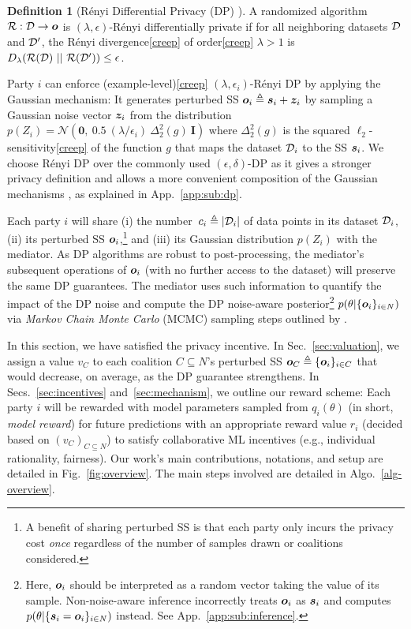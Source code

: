 \documentclass{article}
\DeclareRobustCommand{\hlp}[1]
{{#1}}
\theoremstyle{plain}
\theoremstyle{definition}
\newtheorem{definition}[theorem]{Definition}
\theoremstyle{remark}
\renewcommand{\citet}[1]{\cite{#1}}
\begin{document}
\begin{definition}[R{\'e}nyi Differential Privacy (DP) \cite{mironov2017renyi}]\label{def:renyi}
A randomized algorithm $\mathcal{R}: {\mathcal{D}} \rightarrow {\bm{o}}$ is $(\lambda, \epsilon)$-R{\'e}nyi differentially private if for all neighboring datasets ${\mathcal{D}}$ and ${\mathcal{D}}'$, the R{\'e}nyi divergence\cref{creep}
of order\cref{creep}
$\lambda>1$ is $D_\lambda(\mathcal{R}(\gD)\ ||\ \mathcal{R}(\gD'))  
\leq \epsilon$. 
\end{definition}

Party $i$ can enforce \hlp{(example-level)}\cref{creep}
$(\lambda, \epsilon_i)$-R{\'e}nyi DP by applying the Gaussian mechanism: It generates perturbed SS ${\bm{o}}_i \triangleq {\bm{s}}_i +  {\bm{z}}_i$ by sampling a Gaussian noise vector ${\bm{z}}_i$ from the distribution $p(Z_i)=\mathcal{N}(\boldsymbol{0},\ 0.5\ ({\lambda}/\epsilon_i)\  \Delta_2^2(g)\ \boldsymbol{I})$ 
where $ \Delta_2^2(g)$ is the squared $\ell_2$-sensitivity\cref{creep}
of the function $g$ that maps the dataset ${\mathcal{D}}_i$ to the SS ${\bm{s}}_i$. We choose R{\'e}nyi DP over the commonly used $(\epsilon, \delta)$-DP as it gives a stronger privacy definition and allows a more convenient composition of the Gaussian mechanisms \cite{mironov2017renyi}, as explained in App.~\ref{app:sub:dp}.

Each party $i$ will share (i) the number~$c_i \triangleq |{\mathcal{D}}_i|$ of data points in its dataset ${\mathcal{D}}_i$, (ii) its perturbed SS ${\bm{o}}_i$,\footnote{A benefit of sharing perturbed SS is that each party only incurs the privacy cost \emph{once} regardless of the number of samples drawn or coalitions considered.} and (iii) its Gaussian distribution $p(Z_i)$ with the mediator. As DP algorithms are robust to post-processing, the mediator's subsequent operations of ${\bm{o}}_i$ (with no further access to the dataset) will preserve the same DP guarantees.
The mediator uses such information to quantify the impact of the DP noise and compute the DP noise-aware posterior\footnote{Here, ${\bm{o}}_i$ should be interpreted as a random vector taking the value of its sample. Non-noise-aware inference incorrectly treats ${\bm{o}}_i$ as ${\bm{s}}_i$ and computes $p(\theta|\{ {\bm{s}}_i = {\bm{o}}_i\}_{i \in N})$ instead. See App.~\ref{app:sub:inference}.\label{footnote-vo}}
 $p(\theta | \{{\bm{o}}_i\}_{i \in N})$ via \emph{Markov Chain Monte Carlo} (MCMC) sampling steps outlined by \citet{bernstein2018expfam,bernstein2019blr,kulkarni2021glm}.




In this section, we have satisfied the privacy incentive. In Sec.~\ref{sec:valuation}, we assign a value $v_C$ to each coalition $C \subseteq N$'s perturbed SS ${\bm{o}}_C \triangleq \{{\bm{o}}_i\}_{i \in C}$ that would decrease, on average, as the DP guarantee strengthens.
In Secs.~\ref{sec:incentives} and~\ref{sec:mechanism}, we outline our reward scheme: Each party $i$ will be rewarded with model parameters sampled from $q_i(\theta)$ (in short, \emph{model reward}) for future predictions with an appropriate reward value $r_i$ (decided based on $(v_C)_{C \subseteq N}$) to satisfy collaborative ML incentives (e.g., individual rationality, fairness). Our work's main contributions, notations, and setup are detailed in Fig.~\ref{fig:overview}.
The main steps involved are detailed in Algo.~\ref{alg-overview}.
\end{document}
